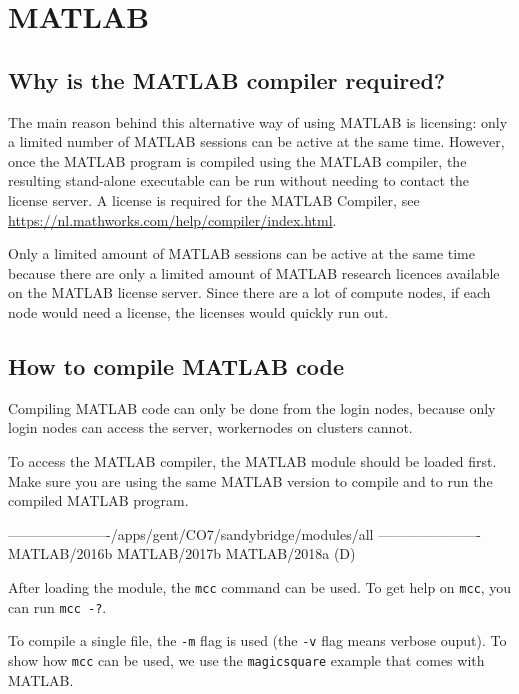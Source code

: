 \chapter{MATLAB}
\label{ch:matlab}

\section{Why is the MATLAB compiler required?}

The main reason behind this alternative way of using MATLAB is licensing: only
a limited number of MATLAB sessions can be active at the same time. However, once
the MATLAB program is compiled using the MATLAB compiler, the resulting stand-alone
executable can be run without needing to contact the license server.
A license is required for the MATLAB Compiler, see \url{https://nl.mathworks.com/help/compiler/index.html}.

\ifgent
Only a limited amount of MATLAB sessions can be active at the same time because
there are only a limited amount of MATLAB research licences available on
the \university MATLAB license server. Since there are a lot of compute nodes,
if each node would need a license, the licenses would quickly run out.
\fi

\section{How to compile MATLAB code}

Compiling MATLAB code can only be done from the login nodes, because only login
nodes can access the server, workernodes on clusters cannot.

To access the MATLAB compiler, the MATLAB module should be loaded first. Make sure
you are using the same MATLAB version to compile and to run the compiled MATLAB
program.

\begin{prompt}
----------------------/apps/gent/CO7/sandybridge/modules/all ----------------------
   MATLAB/2016b    MATLAB/2017b    MATLAB/2018a (D)
\end{prompt}

After loading the module, the \verb|mcc| command can be used. To get help on
\verb|mcc|, you can run \verb|mcc -?|.

To compile a single file, the \verb|-m|
flag is used (the \verb|-v| flag means verbose ouput).
To show how \verb|mcc| can be used, we use the \verb|magicsquare| example
that comes with MATLAB.

